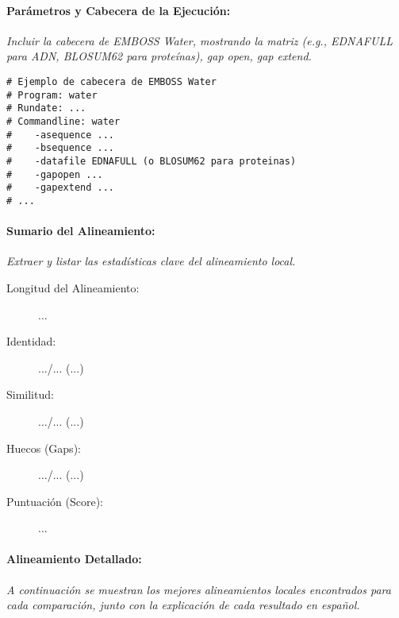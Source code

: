 \documentclass[fleqn,10pt]{article}
\begin{document}
    \paragraph{Parámetros y Cabecera de la Ejecución:}
    \textit{Incluir la cabecera de EMBOSS Water, mostrando la matriz (e.g., EDNAFULL para ADN, BLOSUM62 para proteínas), gap open, gap extend.}
    \begin{lstlisting}[style=outputstyle, caption={Cabecera del resultado de EMBOSS Water (ejemplo)}, basicstyle=\ttfamily\tiny, columns=flexible]
# Ejemplo de cabecera de EMBOSS Water
# Program: water
# Rundate: ...
# Commandline: water
#    -asequence ...
#    -bsequence ...
#    -datafile EDNAFULL (o BLOSUM62 para proteinas)
#    -gapopen ...
#    -gapextend ...
# ...
    \end{lstlisting}

    \paragraph{Sumario del Alineamiento:}
    \textit{Extraer y listar las estadísticas clave del alineamiento local.}
    \begin{description}
        \item[Longitud del Alineamiento:] ...
        \item[Identidad:] .../... (...)
        \item[Similitud:] .../... (...)
        \item[Huecos (Gaps):] .../... (...)
        \item[Puntuación (Score):] ...
    \end{description}

    \paragraph{Alineamiento Detallado:}
    \textit{A continuación se muestran los mejores alineamientos locales encontrados para cada comparación, junto con la explicación de cada resultado en español.}
\end{document}
